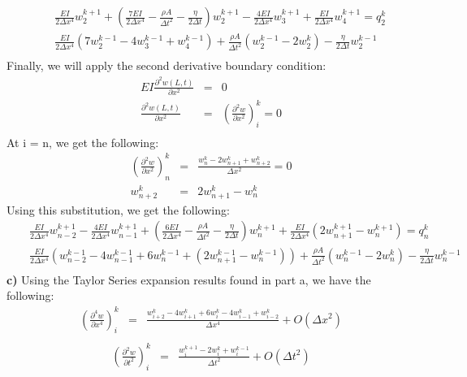 \documentclass[a4paper]{article}
\begin{document}
\begin{eqnarray*}
& & \frac{EI}{2\Delta x^{4}}w^{k+1}_{2} +(\frac{7EI}{2\Delta x^{4}} - \frac{\rho A}{\Delta t^{2}} - \frac{\eta}{2\Delta t})w^{k+1}_{2}-\frac{4EI}{2\Delta x^{4}}w^{k+1}_{3}+\frac{EI}{2\Delta x^{4}}w^{k+1}_{4} = q^{k}_{2}\\
& & \frac{EI}{2\Delta x^{4}}(7 w^{k-1}_{2} - 4 w^{k-1}_{3} +  w^{k-1}_{4}) + \frac{\rho A}{\Delta t^{2}}(w^{k-1}_{2}-2w^{k}_{2}) - \frac{\eta}{2\Delta t}w^{k-1}_{2} \\
\end{eqnarray*}
Finally, we will apply the second derivative boundary condition:
\begin{eqnarray*}
EI\frac{\partial ^{2}w(L,t)}{\partial x^{2}} & = & 0\\
\frac{\partial ^{2}w(L,t)}{\partial x^{2}} & = & (\frac{\partial^{2} w}{\partial x^{2}})^{k}_{i}= 0\\
\end{eqnarray*}
At i = n, we get the following:
\begin{eqnarray*}
(\frac{\partial^{2} w}{\partial x^{2}})^{k}_{n } & = & \frac{w^{k}_{n}-2 w^{k}_{n+1}+w^{k}_{n+2}}{\Delta x^{2}} = 0\\
w^{k}_{n+2} & = & 2 w^{k}_{n+1}-w^{k}_{n}
\end{eqnarray*}
Using this substitution, we get the following:
\begin{eqnarray*}
& & \frac{EI}{2\Delta x^{4}}w^{k+1}_{n-2} - \frac{4EI}{2\Delta x^{4}}w^{k+1}_{n-1} + (\frac{6EI}{2\Delta x^{4}} - \frac{\rho A}{\Delta t^{2}} - \frac{\eta}{2\Delta t})w^{k+1}_{n}+\frac{EI}{2\Delta x^{4}}(2 w^{k+1}_{n+1}-w^{k+1}_{n}) = q^{k}_{n}\\
& & \frac{EI}{2\Delta x^{4}}(w^{k-1}_{n-2} - 4 w^{k-1}_{n-1} + 6 w^{k-1}_{n} +  (2 w^{k-1}_{n+1}-w^{k-1}_{n})) + \frac{\rho A}{\Delta t^{2}}(w^{k-1}_{n}-2w^{k}_{n}) - \frac{\eta}{2\Delta t}w^{k-1}_{n} \\
\end{eqnarray*}
\textbf{c)}
Using the Taylor Series expansion results found in part a, we have the following:
\begin{eqnarray*}
(\frac{\partial ^{4} w}{\partial x^{4}})^{k}_{i} & = & \frac{w^{k}_{i+2} - 4 w^{k}_{i+1} + 6 w^{k}_{i} - 4 w^{k}_{i-1} +  w^{k}_{i-2}}{\Delta x^{4}} + O(\Delta x ^{2})\\
\end{eqnarray*}
\begin{eqnarray*}
(\frac{\partial ^{2} w }{\partial t^{2}})^{k}_{i}& = & \frac{w^{k+1}_{i} - 2 w^{k}_{i} + w^{k-1}_{i} }{\Delta t^{2}} + O(\Delta t^{2})\\
\end{eqnarray*}
\end{document}
